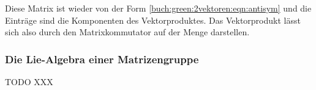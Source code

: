Diese Matrix ist wieder von der Form 
\eqref{buch:green:2vektoren:eqn:antisym}
und die Einträge sind die Komponenten des Vektorproduktes.
Das Vektorprodukt lässt sich also durch den Matrixkommutator
auf der Menge darstellen.

\subsubsection{Die Lie-Algebra einer Matrizengruppe}
TODO XXX

